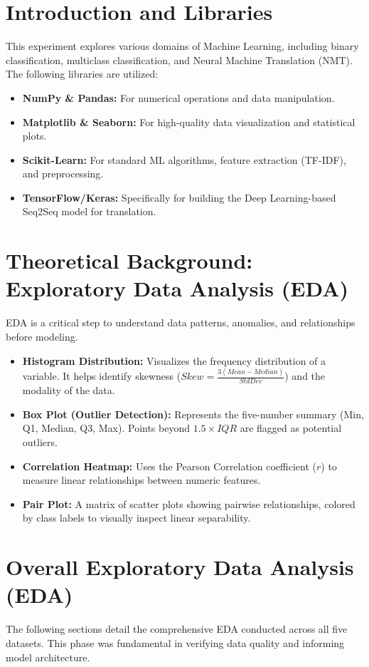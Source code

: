 \documentclass[11pt]{article}
\begin{document}
\section{Introduction and Libraries}
This experiment explores various domains of Machine Learning, including binary classification, multiclass classification, and Neural Machine Translation (NMT). The following libraries are utilized:
\begin{itemize}
    \item \textbf{NumPy \& Pandas:} For numerical operations and data manipulation.
    \item \textbf{Matplotlib \& Seaborn:} For high-quality data visualization and statistical plots.
    \item \textbf{Scikit-Learn:} For standard ML algorithms, feature extraction (TF-IDF), and preprocessing.
    \item \textbf{TensorFlow/Keras:} Specifically for building the Deep Learning-based Seq2Seq model for translation.
\end{itemize}

\section{Theoretical Background: Exploratory Data Analysis (EDA)}
EDA is a critical step to understand data patterns, anomalies, and relationships before modeling.
\begin{itemize}
    \item \textbf{Histogram Distribution:} Visualizes the frequency distribution of a variable. It helps identify skewness ($Skew = \frac{3(Mean - Median)}{StdDev}$) and the modality of the data.
    \item \textbf{Box Plot (Outlier Detection):} Represents the five-number summary (Min, Q1, Median, Q3, Max). Points beyond $1.5 \times IQR$ are flagged as potential outliers.
    \item \textbf{Correlation Heatmap:} Uses the Pearson Correlation coefficient ($r$) to measure linear relationships between numeric features.
    \item \textbf{Pair Plot:} A matrix of scatter plots showing pairwise relationships, colored by class labels to visually inspect linear separability.
\end{itemize}

\section{Overall Exploratory Data Analysis (EDA)}
The following sections detail the comprehensive EDA conducted across all five datasets. This phase was fundamental in verifying data quality and informing model architecture.
\end{document}
